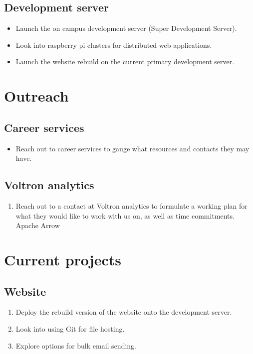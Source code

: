 \documentclass{article}
\begin{document}
\subsection {Development server}
\begin{itemize}
    \item Launch the on campus development server (Super Development Server).
    \item Look into raspberry pi clusters for distributed web applications.
    \item Launch the website rebuild on the current primary development server.
\end{itemize}

\section{Outreach}
\subsection{Career services}
\begin{itemize}
    \item Reach out to career services to gauge what resources and contacts they may have.
\end{itemize}
\subsection{Voltron analytics}
\begin{enumerate}
    \item Reach out to a contact at Voltron analytics to formulate a working plan for what they would like to work with us on, as well as time commitments.
    \subitem Apache Arrow
\end{enumerate}

\section{Current projects}
\subsection{Website}
\begin{enumerate}
    \item Deploy the rebuild version of the website onto the development server.
    \item Look into using Git for file hosting.
    \item Explore options for bulk email sending.
\end{enumerate}
\end{document}
